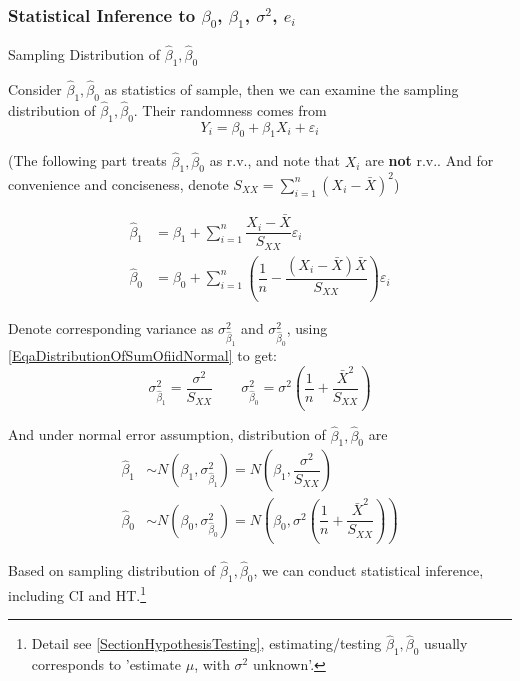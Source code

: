 \subsubsection{Statistical Inference to $ \beta _0 $, $ \beta _1 $, $ \sigma ^2 $, $ e_i $}

\begin{point}
    Sampling Distribution of $ \hat{\beta} _1,\hat{\beta} _0  $
\end{point}

    Consider $ \hat{\beta} _1,\hat{\beta} _0 $ as statistics of sample, then we can examine the sampling distribution of $  \hat{\beta} _1,\hat{\beta} _0 $. Their randomness comes from
    \begin{equation}
        Y_i=\beta_0+\beta_1X_i+\varepsilon _i 
    \end{equation}
    
    

    (The following part treats $\hat{\beta} _1,\hat{\beta} _0 $ as r.v., and note that $ X_i $ are \textbf{not }r.v.. And  for convenience and conciseness, denote $ S_{XX}={\displaystyle\sum_{i=1}^n(X_i-\bar{X})^2} $)

   
\begin{align*}
        \hat{\beta }_1&=\beta _1+\sum_{i=1}^n\dfrac{X_i-\bar{X}}{S_{XX}}\varepsilon _i\\
        \hat{\beta }_0&=\beta _0+\sum_{i=1}^n\left(\dfrac{1}{n}-\dfrac{(X_i-\bar{X})\bar{X}}{S_{XX}}\right)\varepsilon _i
\end{align*}
 
    Denote corresponding variance as $ \sigma^2_{\hat{\beta}_1} $ and $ \sigma^2_{\hat{\beta}_0} $, using \autoref{EqaDistributionOfSumOfiidNormal} to get:
    \begin{equation}
        \sigma^2_{\hat{\beta}_1}= \dfrac{\sigma^2}{S_{XX}}\qquad \sigma^2_{\hat{\beta}_0}=\sigma^2(\dfrac{1}{n}+\dfrac{\bar{X}^2}{S_{XX}})
    \end{equation} 
    
     And under normal error assumption, distribution of $ \hat{\beta} _1,\hat{\beta} _0  $ are
    \begin{align*}
        \hat{\beta }_1&\sim N(\beta _1,\sigma^2_{\hat{\beta}_1}) =N(\beta_1,\dfrac{\sigma^2}{S_{XX}})\\
        \hat{\beta}_0&\sim N(\beta_0,\sigma^2_{\hat{\beta }_0}) =N(\beta_0,\sigma^2(\dfrac{1}{n}+\dfrac{\bar{X}^2}{S_{XX}}))
    \end{align*}
    
    Based on sampling distribution of $ \hat{\beta} _1,\hat{\beta} _0  $, we can conduct statistical inference, including CI and HT.\footnote{Detail see \autoref{SectionHypothesisTesting}, estimating/testing $ \hat{\beta} _1,\hat{\beta} _0  $ usually corresponds to 'estimate $ \mu $, with $ \sigma^2 $ unknown'.}
    
